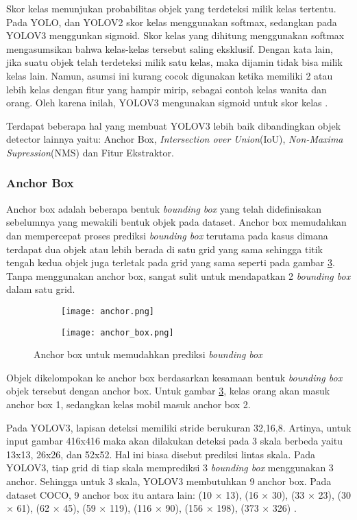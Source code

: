 \documentclass[../thesis.tex]{subfiles}
\begin{document}
Skor kelas menunjukan probabilitas objek yang terdeteksi milik kelas tertentu. Pada YOLO, dan YOLOV2 skor kelas menggunakan softmax, sedangkan pada YOLOV3 menggunkan sigmoid.
Skor kelas yang dihitung menggunakan softmax mengasumsikan bahwa kelas-kelas tersebut saling eksklusif. Dengan kata lain, jika suatu objek telah terdeteksi milik satu kelas, maka dijamin tidak bisa milik kelas lain. 
Namun, asumsi ini kurang cocok digunakan ketika memiliki 2 atau lebih kelas dengan fitur yang hampir mirip, sebagai contoh kelas wanita dan orang. Oleh karena inilah, YOLOV3 mengunakan sigmoid untuk skor kelas \cite{YoloV3}.

Terdapat beberapa hal yang membuat YOLOV3 lebih baik dibandingkan objek detector lainnya yaitu: Anchor Box, \textit{Intersection over Union}(IoU), \textit{Non-Maxima Supression}(NMS) dan Fitur Ekstraktor.
\subsubsection{Anchor Box}
Anchor box adalah beberapa bentuk \textit{bounding box} yang telah didefinisakan sebelumnya yang mewakili bentuk objek pada dataset. Anchor box memudahkan dan mempercepat proses prediksi \textit{bounding box} terutama pada kasus dimana terdapat dua objek atau lebih berada di satu grid yang sama sehingga titik tengah kedua objek juga terletak pada grid yang sama seperti pada gambar \ref{anchor_box_merge}. 
Tanpa menggunakan anchor box, sangat sulit untuk mendapatkan 2 \textit{bounding box} dalam satu grid.

\begin{figure}[htp]
	\centering
	\begin{subfigure}{0.4\textwidth}
	  \texttt{[image: anchor.png]}
	  \caption{}
	  \label{ancor}
	\end{subfigure}
	\begin{subfigure}{0.4\textwidth}
	  \texttt{[image: anchor\_box.png]}
	  \caption{}
	  \label{anchor_box}
	\end{subfigure}
	\caption{Anchor box untuk memudahkan prediksi \textit{bounding box}}
	\label{anchor_box_merge}
  \end{figure}

Objek dikelompokan ke anchor box berdasarkan kesamaan bentuk \textit{bounding box} objek tersebut dengan anchor box. Untuk gambar \ref{anchor_box_merge}, kelas orang akan masuk anchor box 1, sedangkan kelas mobil masuk anchor box 2.

Pada YOLOV3, lapisan deteksi memiliki stride berukuran 32,16,8. Artinya, untuk input gambar 416x416 maka akan dilakukan deteksi pada 3 skala berbeda yaitu 13x13, 26x26, dan 52x52. Hal ini biasa disebut prediksi lintas skala.
Pada YOLOV3, tiap grid di tiap skala memprediksi 3 \textit{bounding box} menggunakan 3 anchor. Sehingga untuk 3 skala, YOLOV3 membutuhkan 9 anchor box. Pada dataset COCO, 9 anchor box itu antara lain: (10 × 13), (16 × 30), (33 × 23), (30 × 61), (62 × 45), (59 ×
119), (116 × 90), (156 × 198), (373 × 326) \cite{YoloV3}.
\end{document}
